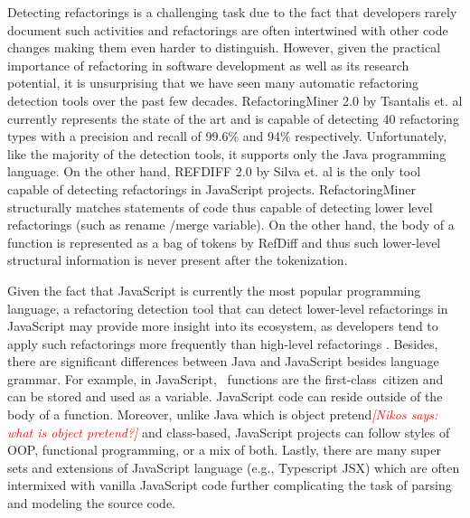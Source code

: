 \documentclass[letterpaper,12pt,onecolumn,final]{report}
\newcommand{\nikos}[1]{\textcolor{red}{{\it [Nikos says: #1]}}}
\begin{document}
Detecting refactorings is a challenging task due to the fact that developers rarely document such activities \cite{alomar2021refactoring} and refactorings are often intertwined with other code changes making them even harder to distinguish. However, given the practical importance of refactoring in software development as well as its research potential, it is unsurprising that we have seen many automatic refactoring detection tools over the past few decades. RefactoringMiner 2.0 by Tsantalis et. al \cite{Tsantalis2020} currently represents the state of the art and is capable of detecting 40 refactoring types with a precision and recall of 99.6\% and 94\% respectively.  Unfortunately, like the majority of the detection tools, it supports only the Java programming language. On the other hand, REFDIFF 2.0 by Silva et. al  \cite{Silva2020} is the only tool capable of detecting refactorings in JavaScript projects. RefactoringMiner structurally matches statements of code thus capable of detecting lower level refactorings (such as rename /merge variable). On the other hand, the body of a function is represented as a bag of tokens by RefDiff and thus such lower-level structural information is never present after the tokenization.

Given the fact that JavaScript is currently the most popular programming language, a refactoring detection tool that can detect lower-level refactorings in JavaScript may provide more insight into its ecosystem, as developers tend to apply such refactorings more frequently than high-level refactorings \cite{MurphyHill2012}. Besides, there are significant differences between Java and JavaScript besides language grammar. For example, in JavaScript,  functions are the first-class citizen and can be stored and used as a variable. JavaScript code can reside outside of the body of a function. Moreover, unlike Java which is object pretend\nikos{what is object pretend?} and class-based, JavaScript projects can follow styles of OOP, functional programming, or a mix of both. Lastly, there are many super sets and extensions of JavaScript language (e.g., Typescript JSX) which are often intermixed with vanilla JavaScript code further complicating the task of parsing and modeling the source code.
\end{document}

